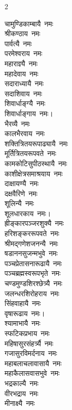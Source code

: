 \begin{multicols}{2}
\begin{flushleft}
चामुण्डिकाम्बायै~नमः\\
श्रीकण्ठाय~नमः\\
पार्वत्यै~नमः\\
परमेश्वराय~नमः\\
महाराज्ञ्यै~नमः\\
महादेवाय~नमः\\
सदाराध्यायै~नमः\\
सदाशिवाय~नमः\\
शिवार्धाङ्ग्यै~नमः\\
शिवार्धाङ्गाय~नमः।\hfill{}\\
भैरव्यै~नमः\\
कालभैरवाय~नमः\\
शक्तित्रितयरूपाढ्यायै~नमः\\
मूर्तित्रितयरूपवते~नमः\\
कामकोटिसुपीठस्थायै~नमः\\
काशीक्षेत्रसमाश्रयाय~नमः\\
दाक्षायण्यै~नमः\\
दक्षवैरिणे~नमः\\
शूलिन्यै~नमः\\
शूलधारकाय~नमः।\hfill{}\\
ह्रीङ्कारपञ्जरशुक्यै~नमः\\
हरिशङ्कररूपवते~नमः\\
श्रीमद्गणेशजनन्यै~नमः\\
षडाननसुजन्मभुवे~नमः\\
पञ्चप्रेतासनारूढायै~नमः\\
पञ्चब्रह्मस्वरूपभृते~नमः\\
चण्डमुण्डशिरश्छेत्र्यै~नमः\\
जलन्धरशिरोहराय~नमः\\
सिंहवाहायै~नमः\\
वृषारूढाय~नमः।\hfill{}\\
श्यामाभायै~नमः\\
स्फटिकप्रभाय~नमः\\
महिषासुरसंहर्त्र्यै~नमः\\
गजासुरविमर्दनाय~नमः\\
महाबलाचलावासायै~नमः\\
महाकैलासवासभुवे~नमः\\
भद्रकाल्यै~नमः\\
वीरभद्राय~नमः\\
मीनाक्ष्यै~नमः\\

\end{flushleft}
\end{multicols}
